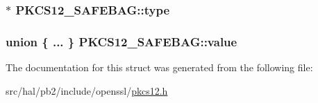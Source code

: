 \subsubsection[{\texorpdfstring{type}{type}}]{$\ast$ P\+K\+C\+S12\+\_\+\+S\+A\+F\+E\+B\+A\+G\+::type}\hypertarget{struct_p_k_c_s12___s_a_f_e_b_a_g_a7e25098bf7d75c05613960d6c9a0e554}{}\label{struct_p_k_c_s12___s_a_f_e_b_a_g_a7e25098bf7d75c05613960d6c9a0e554}
\subsubsection[{\texorpdfstring{value}{value}}]{\setlength{\rightskip}{0pt plus 5cm}union \{ ... \}   P\+K\+C\+S12\+\_\+\+S\+A\+F\+E\+B\+A\+G\+::value}\hypertarget{struct_p_k_c_s12___s_a_f_e_b_a_g_a3d102dc7be12ece2025b2ea69d36482d}{}\label{struct_p_k_c_s12___s_a_f_e_b_a_g_a3d102dc7be12ece2025b2ea69d36482d}


The documentation for this struct was generated from the following file\+:\begin{DoxyCompactItemize}
\item 
src/hal/pb2/include/openssl/\hyperlink{pkcs12_8h}{pkcs12.\+h}\end{DoxyCompactItemize}
